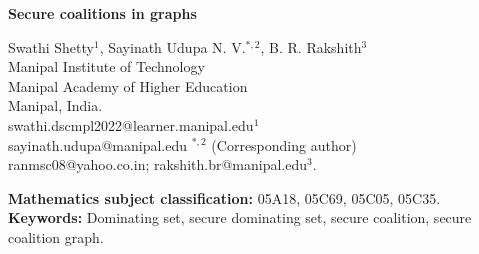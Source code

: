 \documentclass[12pt]{article}
\begin{document}
	\baselineskip 16pt
	\newcommand{\la}{\lambda}
	\newcommand{\si}{\sigma}
	\newcommand{\ol}{1-\lambda}
	\newcommand{\be}{\begin{equation}}
		\newcommand{\ee}{\end{equation}}
	\newcommand{\bea}{\begin{eqnarray}}
		\newcommand{\eea}{\end{eqnarray}}
	
	
	\baselineskip=0.30in
	\begin{center}
		{\Large  \textbf{Secure coalitions in graphs} }\\
		\vspace*{0.3cm} 
	\end{center}
    \begin{center}
		Swathi Shetty$^{1}$, Sayinath Udupa N. V.$^{*,2}$, B. R. Rakshith$^{3}$\\
		Manipal Institute of Technology\\ Manipal Academy of Higher Education\\ Manipal, India. \\
		swathi.dscmpl2022@learner.manipal.edu$^{1}$\\
        sayinath.udupa@manipal.edu	$^{*,2}$ (Corresponding author)\\
		ranmsc08@yahoo.co.in; rakshith.br@manipal.edu$^{3}$.
	\end{center}
    \begin{abstract}
    A secure coalition in a graph $G$ consists of two disjoint vertex sets $V_1$ and $V_2$, neither of which is a secure dominating set, but whose union $V_1 \cup V_2$ forms a secure dominating set. A secure coalition partition ($sec$-partition) of $G$ is a vertex partition $\pi = \{V_1, V_2, \dots, V_k\}$ where each set $V_i$ is either a secure dominating set consisting of a single vertex of degree $n-1$, or a set that is not a secure dominating set but forms a secure coalition with some other set $V_j \in \pi$. The maximum cardinality of a secure coalition partition of $G$ is called the secure coalition number of $G$, denoted $SEC(G)$. For every $sec$-partition $\pi$ of a graph $G$, we associate a graph called the secure coalition graph of $G$ with respect to $\pi$, denoted $SCG(G,\pi)$, where the vertices of $SCG(G,\pi)$ correspond to the sets $V_1, V_2, \dots, V_k$ of $\pi$, and two vertices are adjacent in $SCG(G,\pi)$ if and only if their corresponding sets in $\pi$ form a secure coalition in $G$. In this study, we prove that every graph admits a $sec$-partition. Further, we characterize the graphs $G$ with $SEC(G) \in \{1,2,n\}$ and all trees $T$ with $SEC(T) = n-1$. Finally, we show that every graph $G$ without isolated vertices is a secure coalition graph.
\end{abstract}
    \textbf{Mathematics subject classification:} 05A18, 05C69, 05C05, 05C35.\\
\textbf{Keywords:} Dominating set, secure dominating set, secure coalition, secure coalition graph.
\end{document}
